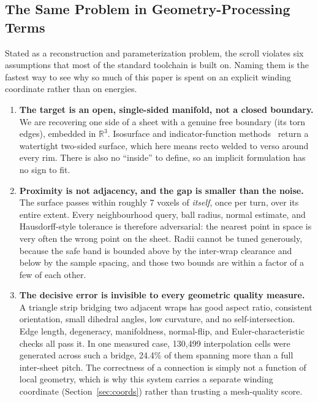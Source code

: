 \subsection{The Same Problem in Geometry-Processing Terms}
\label{sec:gp}

Stated as a reconstruction and parameterization problem, the scroll violates six assumptions that most of the standard toolchain is built on. Naming them is the fastest way to see why so much of this paper is spent on an explicit winding coordinate rather than on energies.

\begin{enumerate}
  \setlength{\itemsep}{3pt}
  \item \textbf{The target is an open, single-sided manifold, not a closed boundary.} We are recovering one side of a sheet with a genuine free boundary (its torn edges), embedded in $\mathbb{R}^3$. Isosurface and indicator-function methods~\cite{lorensen1998marching,kazhdan2006poisson} return a watertight two-sided surface, which here means recto welded to verso around every rim. There is also no ``inside'' to define, so an implicit formulation has no sign to fit.

  \item \textbf{Proximity is not adjacency, and the gap is smaller than the noise.} The surface passes within roughly 7 voxels of \emph{itself}, once per turn, over its entire extent. Every neighbourhood query, ball radius, normal estimate, and Hausdorff-style tolerance is therefore adversarial: the nearest point in space is very often the wrong point on the sheet. Radii cannot be tuned generously, because the safe band is bounded above by the inter-wrap clearance and below by the sample spacing, and those two bounds are within a factor of a few of each other.

  \item \textbf{The decisive error is invisible to every geometric quality measure.} A triangle strip bridging two adjacent wraps has good aspect ratio, consistent orientation, small dihedral angles, low curvature, and no self-intersection. Edge length, degeneracy, manifoldness, normal-flip, and Euler-characteristic checks all pass it. In one measured case, 130,499 interpolation cells were generated across such a bridge, 24.4\% of them spanning more than a full inter-sheet pitch. The correctness of a connection is simply not a function of local geometry, which is why this system carries a separate winding coordinate (Section~\ref{sec:coords}) rather than trusting a mesh-quality score.


\end{enumerate}
